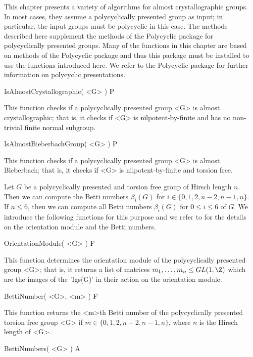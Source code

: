 

This chapter presents a variety of algorithms for almost crystallographic
groups. In most cases, they assume a polycyclically presented group as 
input; in particular, the input groups must be polycyclic in this case.
The methods described here supplement the methods of the {\sf Polycyclic} 
package for polycyclically presented groups. Many of the functions in this 
chapter are based on methods of the {\sf Polycyclic} package and thus this 
package must be installed to use the functions introduced here. We refer to
the {\sf Polycyclic} package for further information on polycyclic 
presentations.


\> IsAlmostCrystallographic( <G> ) P

This function checks if a polycyclically presented group <G> is almost
crystallographic; that is, it checks if <G> is nilpotent-by-finite and
has no non-trivial finite normal subgroup.  

\> IsAlmostBieberbachGroup( <G> ) P

This function checks if a polycyclically presented group <G> is almost
Bieberbach; that is, it checks if <G> is nilpotent-by-finite and torsion
free.


Let $G$ be a polycyclically presented and torsion free group of Hirsch 
length $n$. Then we can compute the Betti numbers $\beta_i(G)$ for $i \in 
\{0, 1, 2, n-2, n-1, n\}$. If $n \leq 6$, then we can compute all Betti
numbers $\beta_i(G)$ for $0 \leq i \leq 6$ of $G$. We introduce the following
functions for this purpose and we refer to \cite{BRO} for the details on 
the orientation module and the Betti numbers.

\> OrientationModule( <G> ) F

This function determines the orientation module of the polycyclically
presented group <G>; that is, it returns a list of matrices $m_1, \ldots,
m_n \leq GL( 1, \Z )$ which are the images of the 'Igs(G)' in their action
on the orientation module.  

\> BettiNumber( <G>, <m> ) F

This function returns the <m>th Betti number of the polycyclically presented
torsion free group <G> if $m \in \{0, 1, 2, n-2, n-1, n\}$, where $n$ is the 
Hirsch length of <G>. 

\> BettiNumbers( <G> ) A

